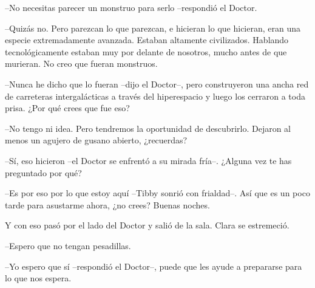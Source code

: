 {--No necesitas parecer un monstruo para serlo --respondió el Doctor.}

{--Quizás no. Pero parezcan lo que parezcan, e hicieran lo que hicieran,
 eran una especie extremadamente avanzada. Estaban altamente civilizados.
 Hablando tecnológicamente estaban muy por delante de nosotros, mucho
antes de que murieran. No creo que fueran monstruos.}

{--Nunca he dicho que lo fueran --dijo el Doctor--, pero construyeron una
 ancha red de carreteras intergalácticas a través del hiperespacio y
luego los cerraron a toda prisa. ¿Por qué crees que fue eso?}

{--No tengo ni idea. Pero tendremos la oportunidad de descubrirlo.
Dejaron al menos un agujero de gusano abierto, ¿recuerdas?}

{--Sí, eso hicieron --el Doctor se enfrentó a su mirada fría--. ¿Alguna
vez te has preguntado por qué?}

{--Es por eso por lo que estoy aquí --Tibby sonrió con frialdad--. Así
que es un poco tarde para asustarme ahora, ¿no crees? Buenas noches.}

{Y con eso pasó por el lado del Doctor y salió de la sala. Clara se
estremeció.}

{--Espero que no tengan pesadillas.}

{--Yo espero que sí --respondió el Doctor--, puede que les ayude a
prepararse para lo que nos espera.}
